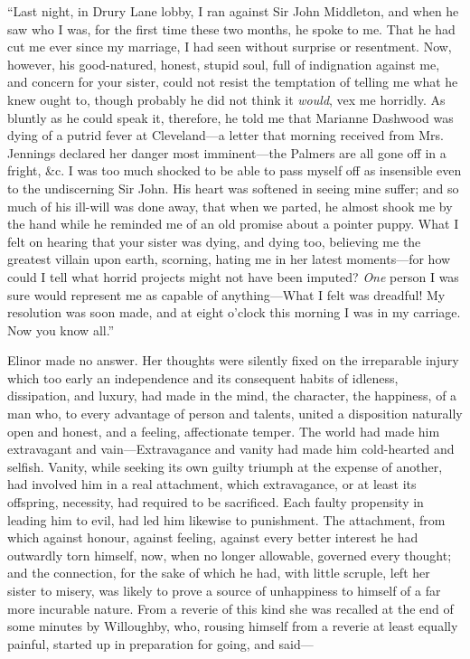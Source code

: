 “Last night, in Drury Lane lobby, I ran against Sir John Middleton, and when he saw who I was, for the first time these two months, he spoke to me. That he had cut me ever since my marriage, I had seen without surprise or resentment. Now, however, his good-natured, honest, stupid soul, full of indignation against me, and concern for your sister, could not resist the temptation of telling me what he knew ought to, though probably he did not think it {\em would}, vex me horridly. As bluntly as he could speak it, therefore, he told me that Marianne Dashwood was dying of a putrid fever at Cleveland---a letter that morning received from Mrs. Jennings declared her danger most imminent---the Palmers are all gone off in a fright, &c. I was too much shocked to be able to pass myself off as insensible even to the undiscerning Sir John. His heart was softened in seeing mine suffer; and so much of his ill-will was done away, that when we parted, he almost shook me by the hand while he reminded me of an old promise about a pointer puppy. What I felt on hearing that your sister was dying, and dying too, believing me the greatest villain upon earth, scorning, hating me in her latest moments---for how could I tell what horrid projects might not have been imputed? {\em One} person I was sure would represent me as capable of anything---What I felt was dreadful! My resolution was soon made, and at eight o'clock this morning I was in my carriage. Now you know all.”

Elinor made no answer. Her thoughts were silently fixed on the irreparable injury which too early an independence and its consequent habits of idleness, dissipation, and luxury, had made in the mind, the character, the happiness, of a man who, to every advantage of person and talents, united a disposition naturally open and honest, and a feeling, affectionate temper. The world had made him extravagant and vain---Extravagance and vanity had made him cold-hearted and selfish. Vanity, while seeking its own guilty triumph at the expense of another, had involved him in a real attachment, which extravagance, or at least its offspring, necessity, had required to be sacrificed. Each faulty propensity in leading him to evil, had led him likewise to punishment. The attachment, from which against honour, against feeling, against every better interest he had outwardly torn himself, now, when no longer allowable, governed every thought; and the connection, for the sake of which he had, with little scruple, left her sister to misery, was likely to prove a source of unhappiness to himself of a far more incurable nature. From a reverie of this kind she was recalled at the end of some minutes by Willoughby, who, rousing himself from a reverie at least equally painful, started up in preparation for going, and said---

